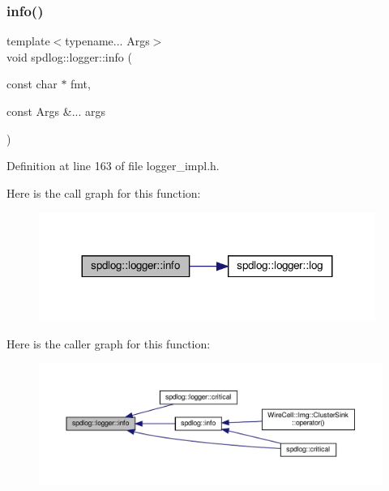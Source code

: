 \subsubsection{\texorpdfstring{info()}{info()}\hspace{0.1cm}{\footnotesize\ttfamily [1/2]}}
{\footnotesize\ttfamily template$<$typename... Args$>$ \\
void spdlog\+::logger\+::info (\begin{DoxyParamCaption}\item[{const char $\ast$}]{fmt,  }\item[{const Args \&...}]{args }\end{DoxyParamCaption})\hspace{0.3cm}{\ttfamily [inline]}}



Definition at line 163 of file logger\+\_\+impl.\+h.

Here is the call graph for this function\+:
\nopagebreak
\begin{figure}[H]
\begin{center}
\leavevmode
\includegraphics[width=311pt]{classspdlog_1_1logger_a72f80c2e379df565c628adab1efdab34_cgraph}
\end{center}
\end{figure}
Here is the caller graph for this function\+:
\nopagebreak
\begin{figure}[H]
\begin{center}
\leavevmode
\includegraphics[width=350pt]{classspdlog_1_1logger_a72f80c2e379df565c628adab1efdab34_icgraph}
\end{center}
\end{figure}
\mbox{\label{classspdlog_1_1logger_a1e1dff0caa0d1bf072739dfcc1e331d8}} 
